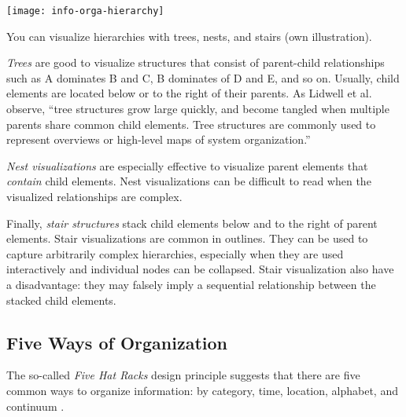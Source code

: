 \begin{marginfigure}
\centering
\texttt{[image: info-orga-hierarchy]}
\caption{\label{fig:hierarchy} You can visualize hierarchies with trees, nests, and stairs (own illustration).}%
\end{marginfigure}


\emph{Trees} are good to visualize structures that consist of parent-child relationships such as A dominates B and C, B dominates of D and E, and so on. 
Usually, child elements are located below or to the right of their parents. As Lidwell et al. \cite{Lidwell10} observe, ``tree structures grow large quickly, and become tangled when multiple parents share common child elements. Tree structures are commonly used to represent overviews or high-level maps of system organization.''

\emph{Nest visualizations} are especially effective to visualize parent elements that \emph{contain} child elements. Nest visualizations can be difficult to read when the visualized relationships are complex.

Finally, \emph{stair structures} stack child elements below and to the right of parent elements. Stair visualizations are common in outlines. They can be used to capture arbitrarily complex hierarchies, especially when they are used interactively and individual nodes can be collapsed. Stair visualization also have a disadvantage: they may falsely imply a sequential relationship between the stacked child elements.

\subsection{Five Ways of Organization}
\label{sec:fivehatracks}

The so-called \emph{Five Hat Racks} design principle suggests that there are five common ways to organize information: by category, time, location, alphabet, and continuum \cite{Lidwell10}.

